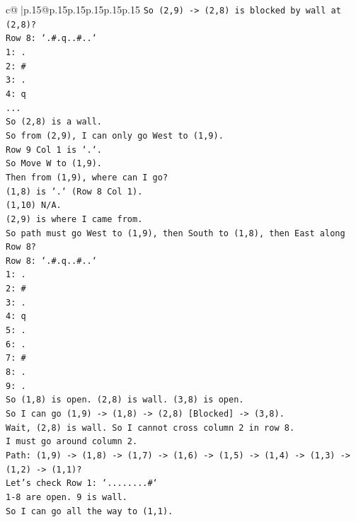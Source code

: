 \documentclass{article}
\begin{document}
{\begin{supertabular}{c@{$\;$}|p{.15\linewidth}@{}p{.15\linewidth}p{.15\linewidth}p{.15\linewidth}p{.15\linewidth}p{.15\linewidth}}
{{{\texttt{So (2,9) {-}> (2,8) is blocked by wall at (2,8)?} \\
\texttt{Row 8: `.\#.q..\#..`} \\
\texttt{1: .} \\
\texttt{2: \#} \\
\texttt{3: .} \\
\texttt{4: q} \\
\texttt{...} \\
\texttt{So (2,8) is a wall.} \\
\texttt{So from (2,9), I can only go West to (1,9).} \\
\texttt{Row 9 Col 1 is `.`.} \\
\texttt{So Move W to (1,9).} \\
\texttt{Then from (1,9), where can I go?} \\
\texttt{(1,8) is `.` (Row 8 Col 1).} \\
\texttt{(1,10) N/A.} \\
\texttt{(2,9) is where I came from.} \\
\texttt{So path must go West to (1,9), then South to (1,8), then East along Row 8?} \\
\texttt{Row 8: `.\#.q..\#..`} \\
\texttt{1: .} \\
\texttt{2: \#} \\
\texttt{3: .} \\
\texttt{4: q} \\
\texttt{5: .} \\
\texttt{6: .} \\
\texttt{7: \#} \\
\texttt{8: .} \\
\texttt{9: .} \\
\texttt{So (1,8) is open. (2,8) is wall. (3,8) is open.} \\
\texttt{So I can go (1,9) {-}> (1,8) {-}> (2,8) {[}Blocked{]} {-}> (3,8).} \\
\texttt{Wait, (2,8) is wall. So I cannot cross column 2 in row 8.} \\
\texttt{I must go around column 2.} \\
\texttt{Path: (1,9) {-}> (1,8) {-}> (1,7) {-}> (1,6) {-}> (1,5) {-}> (1,4) {-}> (1,3) {-}> (1,2) {-}> (1,1)?} \\
\texttt{Let's check Row 1: `........\#`} \\
\texttt{1{-}8 are open. 9 is wall.} \\
\texttt{So I can go all the way to (1,1).} \\
}}}
\end{supertabular}}
\end{document}
